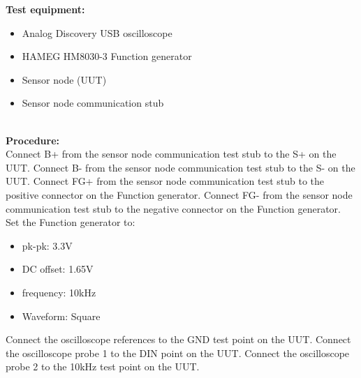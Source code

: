 \textbf{Test equipment:}
\begin{itemize}
	\item Analog Discovery USB oscilloscope
	\item HAMEG HM8030-3 Function generator
	\item Sensor node (UUT)
	\item Sensor node communication stub
\end{itemize}
\ \\
\textbf{Procedure:}\\
Connect B+ from the sensor node communication test stub to the S+ on the UUT. Connect B- from the sensor node communication test stub to the S- on the UUT.
Connect FG+ from the sensor node communication test stub to the positive connector on the Function generator. Connect FG- from the sensor node communication test stub to the negative connector on the Function generator.\\ Set the Function generator to:
\begin{itemize}
	\item pk-pk: 3.3V
	\item DC offset: 1.65V
	\item frequency: 10kHz
	\item Waveform: Square
\end{itemize}

Connect the oscilloscope references to the GND test point on the UUT.
Connect the oscilloscope probe 1 to the DIN point on the UUT.
Connect the oscilloscope probe 2 to the 10kHz test point on the UUT.\\


\begin{figure}[H]
	\centering
\end{figure}

